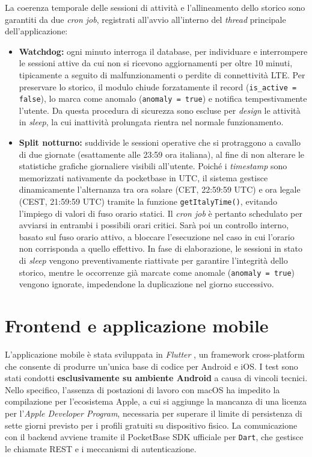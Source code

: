 \documentclass[12pt,a4paper]{article}
\begin{document}
La coerenza temporale delle sessioni di attività e l'allineamento dello storico sono garantiti da due \textit{cron job}, registrati all'avvio all'interno del \textit{thread} principale dell'applicazione:
\begin{itemize}
    \item \textbf{Watchdog:} ogni minuto interroga il database, per individuare e interrompere le sessioni attive da cui non si ricevono aggiornamenti per oltre 10 minuti, tipicamente a seguito di malfunzionamenti o perdite di connettività LTE. Per preservare lo storico, il modulo chiude forzatamente il record (\texttt{is\_active = false}), lo marca come anomalo (\texttt{anomaly = true}) e notifica tempestivamente l'utente. Da questa procedura di sicurezza sono escluse per \textit{design} le attività in \textit{sleep}, la cui inattività prolungata rientra nel normale funzionamento.    
    \item \textbf{Split notturno:} suddivide le sessioni operative che si protraggono a cavallo di due giornate (esattamente alle 23:59 ora italiana), al fine di non alterare le statistiche grafiche giornaliere visibili all'utente. Poiché i \textit{timestamp} sono memorizzati nativamente da pocketbase in UTC, il sistema gestisce dinamicamente l'alternanza tra ora solare (CET, 22:59:59 UTC) e ora legale (CEST, 21:59:59 UTC) tramite la funzione \texttt{getItalyTime()}, evitando l'impiego di valori di fuso orario statici. Il \textit{cron job} è pertanto schedulato per avviarsi in entrambi i possibili orari critici. Sarà poi un controllo interno, basato sul fuso orario attivo, a bloccare l'esecuzione nel caso in cui l'orario non corrisponda a quello effettivo. In fase di elaborazione, le sessioni in stato di \textit{sleep} vengono preventivamente riattivate per garantire l'integrità dello storico, mentre le occorrenze già marcate come anomale (\texttt{anomaly = true}) vengono ignorate, impedendone la duplicazione nel giorno successivo.
\end{itemize}

\section{Frontend e applicazione mobile}

L'applicazione mobile è stata sviluppata 
in \textit{Flutter} \cite{flutter}, un framework
cross-platform che consente di produrre un'unica 
base di codice per Android e iOS.
I test sono stati condotti \textbf{esclusivamente su 
ambiente Android} a causa di vincoli tecnici. 
Nello specifico, l'assenza di postazioni di lavoro con macOS 
ha impedito la compilazione per l'ecosistema Apple, 
a cui si aggiunge la mancanza di una licenza per l'\textit{Apple Developer Program}, 
necessaria per superare il limite di persistenza 
di sette giorni previsto per i profili gratuiti su dispositivo fisico.
La comunicazione con il backend avviene tramite 
il PocketBase SDK ufficiale per \texttt{Dart}, 
che gestisce le chiamate REST e i meccanismi di autenticazione.
\end{document}
